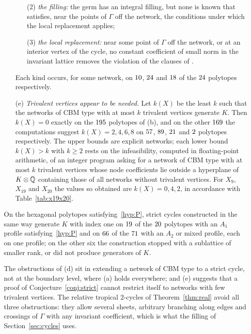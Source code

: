 \begin{enumerate}
\begin{enumerate}
\item[(2)] \emph{the filling:} the germ has an integral filling, but none is known that satisfies, near the points of
$\Gamma$ off the network, the conditions under which the local replacement applies;
\item[(3)] \emph{the local replacement:} near some point of $\Gamma$ off the network, or at an interior vertex of the
cycle, no constant coefficient of small norm in the invariant lattice removes the violation of the clauses of
\cite[Def.~7.2]{CBM}.
\end{enumerate}
Each kind occurs, for some network, on $\NFailSheet$, $\NFailFill$ and $\NFailLocal$ of the $\NRemaining$ polytopes
respectively.
\item[(e)] \emph{Trivalent vertices appear to be needed.} Let $k(X)$ be the least $k$ such that the networks of CBM type with at
most $k$ trivalent vertices generate $K$. Then $k(X)=0$ exactly on the $195$ polytopes of (b), and on the other
$169$ the computations suggest $k(X)=2,4,6,8$ on $57$, $89$, $21$ and $2$
polytopes respectively. The upper bounds are explicit networks; each lower bound $k(X)>k$ with $k\ge2$ rests on the
infeasibility, computed in floating-point arithmetic, of an integer program asking for a network of CBM type with at most
$k$ trivalent vertices whose node coefficients lie outside a hyperplane of $K\otimes\mathbb Q$ containing those of all networks
without trivalent vertices. For $X_9$, $X_{19}$ and $X_{20}$ the values so obtained are $k(X)=0,4,2$, in accordance with
Table~\ref{tab:x19x20}.
\end{enumerate}
On the hexagonal polytopes satisfying~\ref{hyp:P}, strict cycles constructed in the same way generate $K$ with index one on
$19$ of the $20$ polytopes with an $A_1$ profile satisfying~\ref{hyp:P} and on $66$ of the
$71$ with an $A_2$ or mixed profile, each on one profile; on the other six the construction stopped with a
sublattice of smaller rank, or did not produce generators of $K$.

The obstructions of (d) sit in extending a network of CBM type to a strict cycle, not at the boundary level, where
(a) holds everywhere; and (e) suggests that a proof of Conjecture~\ref{conj:strict} cannot restrict itself to networks
with few trivalent vertices. The relative tropical $2$-cycles of Theorem~\ref{thm:real} avoid all three obstructions: they allow
several sheets, arbitrary branching along edges and crossings of $\Gamma$ with any invariant coefficient, which is what the
filling of Section~\ref{sec:cycles} uses.
